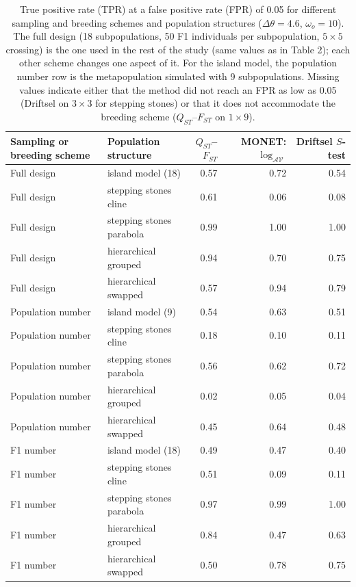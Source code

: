 \begin{table}[htbp]
\centering
\caption{True positive rate (TPR) at a false positive rate (FPR) of 0.05 for different sampling and breeding schemes and population structures ($\Delta\theta = 4.6$, $\omega_o = 10$). The full design (18 subpopulations, 50 F1 individuals per subpopulation, $5 \times 5$ crossing) is the one used in the rest of the study (same values as in Table 2); each other scheme changes one aspect of it. For the island model, the population number row is the metapopulation simulated with 9 subpopulations. Missing values indicate either that the method did not reach an FPR as low as 0.05 (Driftsel on $3 \times 3$ for stepping stones) or that it does not accommodate the breeding scheme ($Q_{ST}$--$F_{ST}$ on $1 \times 9$).}
\label{tab:sampling_breeding}
\begin{tabular}{llrrr}
\toprule
Sampling or breeding scheme & Population structure & $Q_{ST}$--$F_{ST}$ & MONET: $\log_{\mathcal{AV}}$ & Driftsel $S$-test \\
\midrule
Full design & island model (18) & 0.57 & 0.72 & 0.54 \\
Full design & stepping stones cline & 0.61 & 0.06 & 0.08 \\
Full design & stepping stones parabola & 0.99 & 1.00 & 1.00 \\
Full design & hierarchical grouped & 0.94 & 0.70 & 0.75 \\
Full design & hierarchical swapped & 0.57 & 0.94 & 0.79 \\
\midrule
Population number & island model (9) & 0.54 & 0.63 & 0.51 \\
Population number & stepping stones cline & 0.18 & 0.10 & 0.11 \\
Population number & stepping stones parabola & 0.56 & 0.62 & 0.72 \\
Population number & hierarchical grouped & 0.02 & 0.05 & 0.04 \\
Population number & hierarchical swapped & 0.45 & 0.64 & 0.48 \\
\midrule
F1 number & island model (18) & 0.49 & 0.47 & 0.40 \\
F1 number & stepping stones cline & 0.51 & 0.09 & 0.11 \\
F1 number & stepping stones parabola & 0.97 & 0.99 & 1.00 \\
F1 number & hierarchical grouped & 0.84 & 0.47 & 0.63 \\
F1 number & hierarchical swapped & 0.50 & 0.78 & 0.75 \\
\midrule

\end{tabular}
\end{table}
